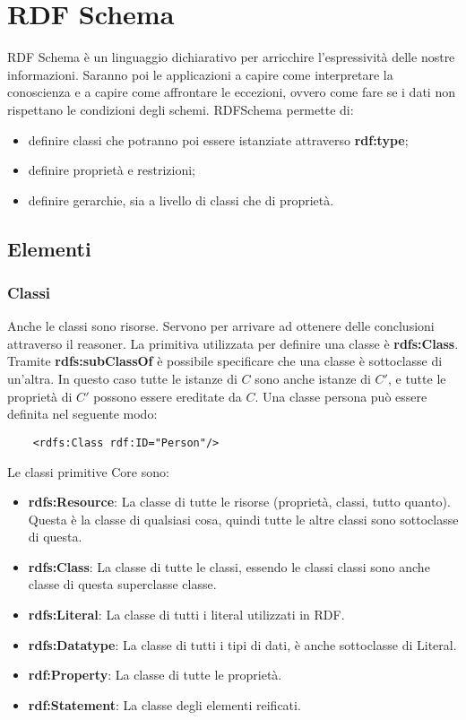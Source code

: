 \section{RDF Schema}
RDF Schema è un linguaggio dichiarativo per arricchire l'espressività delle nostre informazioni. Saranno poi le applicazioni a capire come interpretare la conoscienza e a capire come affrontare le eccezioni, ovvero come fare se i dati non rispettano le condizioni degli schemi.\newline
RDFSchema permette di:
\begin{itemize}
	\item definire classi che potranno poi essere istanziate attraverso \textbf{rdf:type};
	\item definire proprietà e restrizioni;
	\item definire gerarchie, sia a livello di classi che di proprietà.
\end{itemize}

\subsection{Elementi}
\subsubsection{Classi}
Anche le classi sono risorse. Servono per arrivare ad ottenere delle conclusioni attraverso il reasoner. La primitiva utilizzata per definire una classe è \textbf{rdfs:Class}. Tramite \textbf{rdfs:subClassOf} è possibile specificare che una classe è sottoclasse di un'altra. In questo caso tutte le istanze di $C$ sono anche istanze di $C'$, e tutte le proprietà di $C'$ possono essere ereditate da $C$.\newline
Una classe persona può essere definita nel seguente modo:
\begin{verbatim}
	<rdfs:Class rdf:ID="Person"/>
\end{verbatim}
Le classi primitive Core sono:
\begin{itemize}
	\item \textbf{rdfs:Resource}: La classe di tutte le risorse (proprietà, classi, tutto quanto). Questa è la classe di qualsiasi cosa, quindi tutte le altre classi sono sottoclasse di questa.
	\item \textbf{rdfs:Class}: La classe di tutte le classi, essendo le classi classi sono anche classe di questa superclasse classe.
	\item \textbf{rdfs:Literal}: La classe di tutti i literal utilizzati in RDF.
	\item \textbf{rdfs:Datatype}: La classe di tutti i tipi di dati, è anche sottoclasse di Literal.
	\item \textbf{rdf:Property}: La classe di tutte le proprietà.
	\item \textbf{rdf:Statement}: La classe degli elementi reificati.
\end{itemize}

